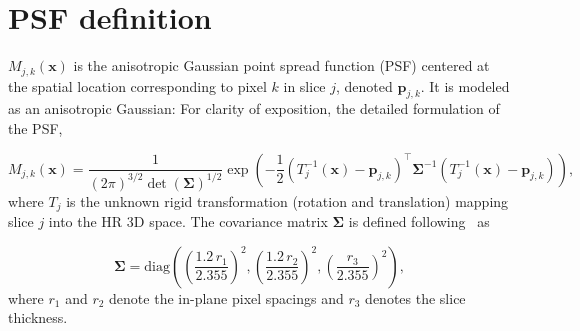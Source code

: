 \documentclass[preprint,authoryear,12pt]{elsarticle}
\begin{document}
 



%
\newpage

%




\newpage
\appendix
\section{PSF definition}
\label{sec:annexe1}
$M_{j,k}(\mathbf{x})$ is the anisotropic Gaussian point spread function (PSF) centered at the spatial location corresponding to pixel $k$ in slice $j$, denoted $\mathbf{p}_{j,k}$. It is modeled as an anisotropic Gaussian:
For clarity of exposition, the detailed formulation of the PSF, 

\begin{equation*}
M_{j,k}(\mathbf{x})
=
\frac{1}{(2\pi)^{3/2} \det(\boldsymbol{\Sigma})^{1/2}}
\exp\!\left(
-\frac{1}{2}
\left(
T_j^{-1}(\mathbf{x}) - \mathbf{p}_{j,k}
\right)^\top
\boldsymbol{\Sigma}^{-1}
\left(
T_j^{-1}(\mathbf{x}) - \mathbf{p}_{j,k}
\right)
\right),
\end{equation*}
where $T_j$ is the unknown rigid transformation (rotation and translation) mapping slice $j$ into the HR 3D space. The covariance matrix $\boldsymbol{\Sigma}$ is defined following~\citep{rousseau_registration-based_2006} as

\begin{equation*}
\boldsymbol{\Sigma}
=
\mathrm{diag}
\left(
\left(\frac{1.2\, r_1}{2.355}\right)^2,
\left(\frac{1.2\, r_2}{2.355}\right)^2,
\left(\frac{r_3}{2.355}\right)^2
\right),
\end{equation*}
where $r_1$ and $r_2$ denote the in-plane pixel spacings and $r_3$ denotes the slice thickness.
\end{document}
